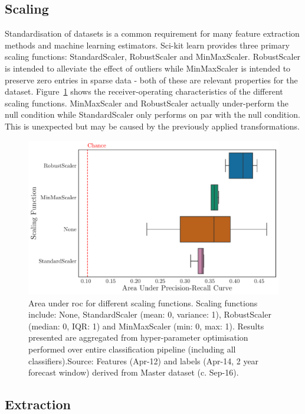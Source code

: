 \documentclass[../thesis/thesis.tex]{subfiles}
\begin{document}
\subsection{Scaling}

Standardisation of datasets is a common requirement for many feature extraction methods and machine learning estimators. Sci-kit learn provides three primary scaling functions: StandardScaler, RobustScaler and MinMaxScaler. RobustScaler is intended to alleviate the effect of outliers while MinMaxScaler is intended to preserve zero entries in sparse data - both of these are relevant properties for the dataset. Figure~\ref{fig:design:scaler} shows the receiver-operating characteristics of the different scaling functions. MinMaxScaler and RobustScaler actually under-perform the null condition while StandardScaler only performs on par with the null condition. This is unexpected but may be caused by the previously applied transformations.

\begin{figure}[!htb]
    \centering
    \includegraphics[width=\textwidth]{../figures/design/scaler}
    \caption[Area under PR Curves by scaling function]{Area under \gls{roc} for different scaling functions. Scaling functions include: None, StandardScaler (mean: 0, variance: 1), RobustScaler (median: 0, IQR: 1) and MinMaxScaler (min: 0, max: 1). Results presented are aggregated from hyper-parameter optimisation performed over entire classification pipeline (including all classifiers).Source: Features (Apr-12) and labels (Apr-14, 2 year forecast window) derived from Master dataset (c. Sep-16).}
    \label{fig:design:scaler}
\end{figure}

\subsection{Extraction}
\end{document}
